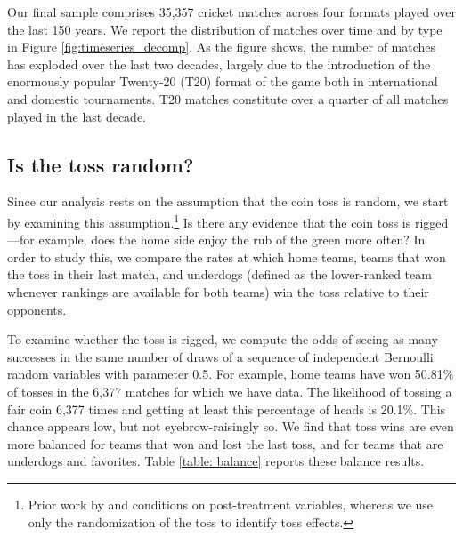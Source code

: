 \documentclass[11pt,  letterpaper]{article}
\begin{document}
Our final sample comprises 35,357 cricket matches across four formats played over the last 150 years. We report the distribution of matches over time and by type in Figure \ref{fig:timeseries_decomp}. As the figure shows, the number of matches has exploded over the last two decades, largely due to the introduction of the enormously popular Twenty-20 (T20) format of the game both in international and domestic tournaments. T20 matches constitute over a quarter of all matches played in the last decade.


\subsection{Is the toss random?}

Since our analysis rests on the assumption that the coin toss is random, we start by examining this assumption.\footnote{Prior work by \citet{shafqat2015analysis} and \citet{dawson2009bat} conditions on post-treatment variables, whereas we use only the randomization of the toss to identify toss effects.} Is there any evidence that the coin toss is rigged---for example, does the home side enjoy the rub of the green more often? In order to study this, we compare the rates at which home teams, teams that won the toss in their last match, and underdogs (defined as the lower-ranked team whenever rankings are available for both teams) win the toss relative to their opponents. 

To examine whether the toss is rigged, we compute the odds of seeing as many successes in the same number of draws of a sequence of independent Bernoulli random variables with parameter 0.5. For example, home teams have won 50.81\% of tosses in the 6,377 matches for which we have data. The likelihood of tossing a fair coin 6,377 times and getting at least this percentage of heads is 20.1\%. This chance appears low, but not eyebrow-raisingly so. We find that toss wins are even more balanced for teams that won and lost the last toss, and for teams that are underdogs and favorites. Table \ref{table: balance} reports these balance results. 
\end{document}
